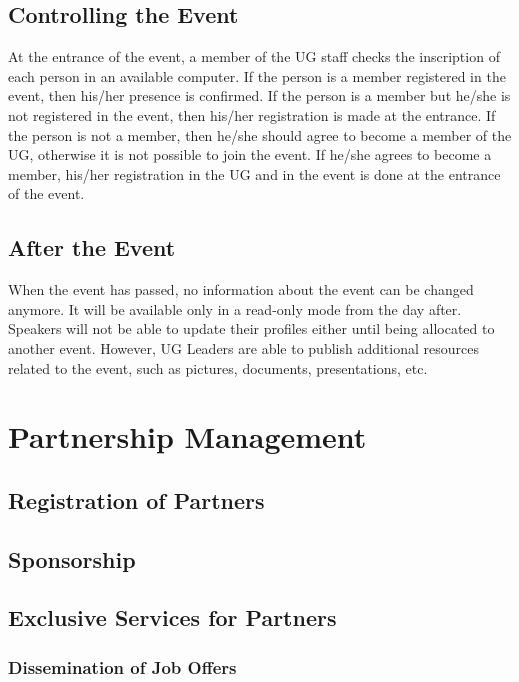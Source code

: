 \documentclass[envcountsame,envcountchap,letterpaper]{svmono}
\begin{document}
\section{Controlling the Event}

At the entrance of the event, a member of the UG staff checks the inscription of each person in an available computer. If the person is a member registered in the event, then his/her presence is confirmed. If the person is a member but he/she is not registered in the event, then his/her registration is made at the entrance. If the person is not a member, then he/she should agree to become a member of the UG, otherwise it is not possible to join the event. If he/she agrees to become a member, his/her registration in the UG and in the event is done at the entrance of the event.

\section{After the Event}

When the event has passed, no information about the event can be changed anymore. It will be available only in a read-only mode from the day after. Speakers will not be able to update their profiles either until being allocated to another event. However, UG Leaders are able to publish additional resources related to the event, such as pictures, documents, presentations, etc.

\chapter{Partnership Management}

\section{Registration of Partners}

\section{Sponsorship}

\section{Exclusive Services for Partners}

\subsection{Dissemination of Job Offers}
\end{document}
